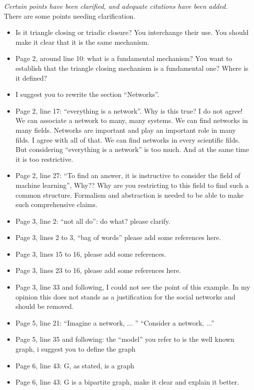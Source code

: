 \documentclass{article}
\begin{document}
\textit{ Certain points have been clarified, and adequate citations have
  been added. } \\

There are some points needing clarification.
\begin{itemize}
\item Is it triangle closing or triadic closure? You interchange their use. You should make it clear that it is the same mechanism.
\item Page 2, around line 10: what is a fundamental mechanism?
You want to establish that the triangle closing mechanism is a fundamental one? Where is it defined?
\item I suggest you to rewrite the section ``Networks''.
\item Page 2, line 17: ``everything is a network''. Why is this true? I do not agree!
We can associate a network to many, many systems. We can find networks in many fields.
Networks are important and play an important role in many filds. I agree with all of that.
We can find networks in every scientific filds. But considering ``everything is a network'' is too much.
And at the same time it is too restrictive.
\item Page 2, line 27: ``To find an answer, it is instructive to consider the field of machine learning'', Why??
Why are you restricting to this field to find such a common structure.
Formalism and abstraction is needed to be able to make such comprehensive claims.
\item Page 3, line 2: ``not all do'': do what? please clarify.
\item Page 3, lines 2 to 3, ``bag of words'' please add some references here.
\item Page 3, lines 15 to 16, please add some references.
\item Page 3, lines 23 to 16, please add some references here.
\item Page 3, line 33 and following, I could not see the point of this example.
In my opinion this does not stands as a  justification for the social networks and should be removed.
\item Page 5, line 21: ``Imagine a network, ... '' \textrightarrow{} ``Consider a network, ...''
\item Page 5, line 35 and following: the ``model'' you refer to is the well known graph, i suggest you to define the graph
\item Page 6, line 43: G, as stated, is a graph
\item Page 6, line 43: G is a bipartite graph, make it clear and explain it better.

\end{itemize}
\end{document}
